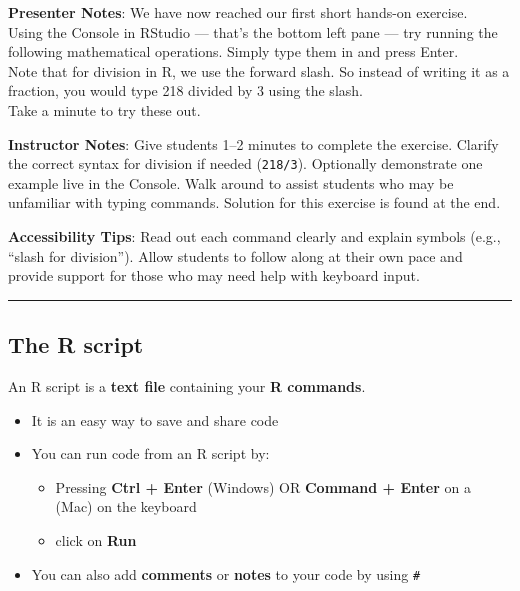 \documentclass[
  letterpaper,
  DIV=11,
  numbers=noendperiod]{scrartcl}
\providecommand{\tightlist}{%
  \setlength{\itemsep}{0pt}\setlength{\parskip}{0pt}}
\begin{document}
\textbf{Presenter Notes}: We have now reached our first short hands-on
exercise.\\
Using the Console in RStudio --- that's the bottom left pane --- try
running the following mathematical operations. Simply type them in and
press Enter.\\
Note that for division in R, we use the forward slash. So instead of
writing it as a fraction, you would type 218 divided by 3 using the
slash.\\
Take a minute to try these out.

\textbf{Instructor Notes}: Give students 1--2 minutes to complete the
exercise. Clarify the correct syntax for division if needed
(\texttt{218/3}). Optionally demonstrate one example live in the
Console. Walk around to assist students who may be unfamiliar with
typing commands. Solution for this exercise is found at the end.

\textbf{Accessibility Tips}: Read out each command clearly and explain
symbols (e.g., ``slash for division''). Allow students to follow along
at their own pace and provide support for those who may need help with
keyboard input.

\begin{center}\rule{0.5\linewidth}{0.5pt}\end{center}

\subsection{The R script}\label{the-r-script}

An R script is a \textbf{text file} containing your \textbf{R commands}.

\begin{itemize}
\item
  It is an easy way to save and share code
\item
  You can run code from an R script by:

  \begin{itemize}
  \tightlist
  \item
    Pressing \textbf{Ctrl + Enter} (Windows) OR \textbf{Command + Enter}
    on a (Mac) on the keyboard\\
  \item
    click on \textbf{Run}
  \end{itemize}
\item
  You can also add \textbf{comments} or \textbf{notes} to your code by
  using \texttt{\#}
\end{itemize}
\end{document}
